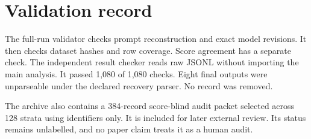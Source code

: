 \documentclass{article}
\begin{document}
\section{Validation record}

The full-run validator checks prompt reconstruction and exact model revisions. It then checks dataset hashes and row coverage. Score agreement has a separate check. The independent result checker reads raw JSONL without importing the main analysis. It passed 1,080 of 1,080 checks. Eight final outputs were unparseable under the declared recovery parser. No record was removed.

The archive also contains a 384-record score-blind audit packet selected across 128 strata using identifiers only. It is included for later external review. Its status remains unlabelled, and no paper claim treats it as a human audit.
\end{document}

